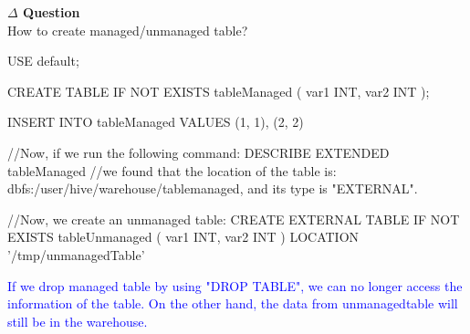 \documentclass[12pt]{article}
\newenvironment{que}
    { \begin{mdframed}[backgroundcolor=green!20] \textbf{$\Delta$ Question} \\}
    {  \end{mdframed}}
\newcommand{\bluep}[1]{\textcolor{blue}{#1}}
\begin{document}
\begin{que}
How to create managed/unmanaged table?
\end{que}
\begin{code}
USE default;

CREATE TABLE IF NOT EXISTS tableManaged (
  var1 INT,
  var2 INT
);

INSERT INTO tableManaged
  VALUES (1, 1), (2, 2)
  
//Now, if we run the following command:
DESCRIBE EXTENDED tableManaged
//we found that the location of the table is: dbfs:/user/hive/warehouse/tablemanaged, and its type is "EXTERNAL".

//Now, we create an unmanaged table:
CREATE EXTERNAL TABLE IF NOT EXISTS tableUnmanaged (
  var1 INT,
  var2 INT
)
LOCATION '/tmp/unmanagedTable'
\end{code}
\bluep{If we drop managed table by using "DROP TABLE", we can no longer access the information of the table. On the other hand, the data from unmanagedtable will still be in the warehouse.}
\end{document}
